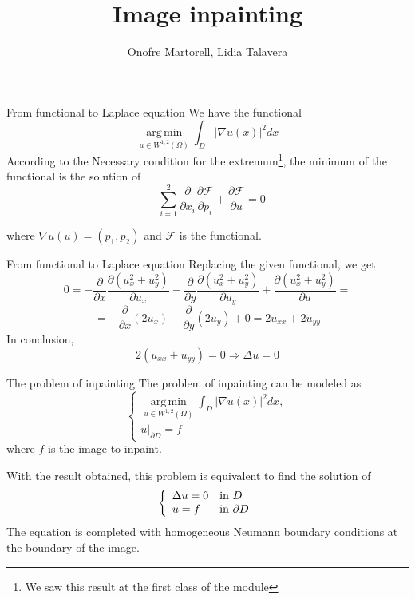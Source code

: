 \documentclass[11pt]{beamer}
\author{Onofre Martorell, Lidia Talavera}
\title{Image inpainting}
\DeclareMathOperator{\argmin}{\mathrm{arg\, min}}
\begin{document}
\begin{frame}
\titlepage
\end{frame}


\begin{frame}{From functional to Laplace equation}
We have the functional
$$
\displaystyle\argmin\limits_{u\in W^{1,2}(\Omega)}\int _D |\nabla u(x)|^2dx
$$
According to the Necessary condition for the extremum\footnote{We saw this result at the first class of the module}, the minimum of the functional is the solution of
$$-\sum_{i=1}^2 \frac{\partial}{\partial x_i}\frac{\partial\mathcal{F}}{\partial p_i} + \frac{\partial\mathcal{F}}{\partial u} = 0$$

where $\nabla u(u) = (p_1, p_2)$ and $\mathcal{F}$ is the functional.
\end{frame}

\begin{frame}{From functional to Laplace equation}
Replacing the given functional, we get
$$ 0 = - \frac{\partial}{\partial x}\frac{\partial(u_x^2 + u_y^2)}{\partial u_x} - \frac{\partial}{\partial y}\frac{\partial(u_x^2 + u_y^2)}{\partial u_y} + \frac{\partial(u_x^2 + u_y^2)}{\partial u} = $$
$$ = - \frac{\partial}{\partial x}(2u_x) - \frac{\partial}{\partial y}(2u_y) + 0 = 2u_{xx} + 2u_{yy}$$
In conclusion,
$$2(u_{xx} + u_{yy})=0\Longrightarrow \Delta u = 0$$
\end{frame}

\begin{frame}{The problem of inpainting}
The problem of inpainting can be modeled as
$$
\begin{cases}
\displaystyle\argmin\limits_{u\in W^{1,2}(\Omega)}\int _D |\nabla u(x)|^2dx,\\
u|_{\partial D} = f
\end{cases}
$$
where $f$ is the image to inpaint.


With the result obtained, this problem is equivalent to find the solution of
$$\left\lbrace
\begin{array}{l l}

\Delta u = 0& \text{in }D \\
u = f & \text{in }\partial D

\end{array}\right.
$$
The equation is completed with homogeneous Neumann boundary
conditions at the boundary of the image.

\end{frame}
\end{document}
